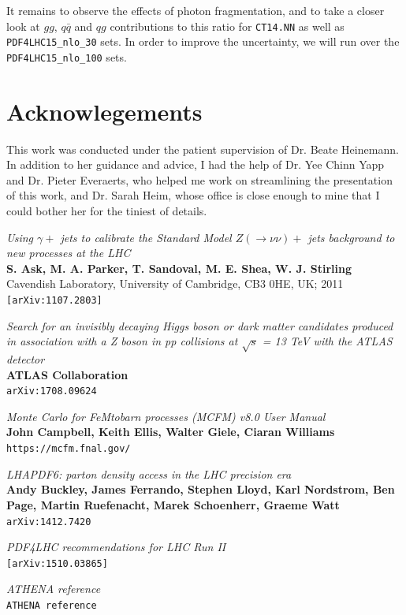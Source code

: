 \documentclass[11pt,a4paper,final]{report}
\begin{document}
It remains to observe the effects of photon fragmentation, and to take a closer look at $gg$, $q\bar{q}$ and $qg$ contributions to this ratio for \texttt{CT14.NN} as well as \texttt{PDF4LHC15\_nlo\_30} sets. In order to improve the uncertainty, we will run over the \texttt{PDF4LHC15\_nlo\_100} sets.

\section*{Acknowlegements}
This work was conducted under the patient supervision of Dr. Beate Heinemann. In addition to her guidance and advice, I had the help of Dr. Yee Chinn Yapp and Dr. Pieter Everaerts, who helped me work on streamlining the presentation of this work, and Dr. Sarah Heim, whose office is close enough to mine that I could bother her for the tiniest of details.

\begin{thebibliography}{9}
	\textit{Using $\gamma +$ jets to calibrate the Standard Model $Z(\rightarrow \nu\nu)+$ jets background to new processes at the LHC}\\
	\textbf{S. Ask, M. A. Parker, T. Sandoval, M. E. Shea, W. J. Stirling}\\
Cavendish Laboratory, University of Cambridge, CB3 0HE, UK; 2011\\
	\texttt{[arXiv:1107.2803]}
	
	\textit{Search for an invisibly decaying Higgs boson or dark matter candidates produced in association with a Z boson in pp collisions at $\sqrt{s}$ = 13 TeV with the ATLAS detector}\\
	\textbf{ATLAS Collaboration}\\
	\texttt{arXiv:1708.09624}

	\textit{Monte Carlo for FeMtobarn processes (MCFM) v8.0 User Manual}\\
	\textbf{John Campbell, Keith Ellis, Walter Giele, Ciaran Williams}\\
	\texttt{https://mcfm.fnal.gov/}
	
	\textit{LHAPDF6: parton density access in the LHC precision era}\\
	\textbf{Andy Buckley, James Ferrando, Stephen Lloyd, Karl Nordstrom, Ben Page, Martin Ruefenacht, Marek Schoenherr, Graeme Watt}\\
	\texttt{arXiv:1412.7420}
	
	\textit{PDF4LHC recommendations for LHC Run II}\\
	\texttt{[arXiv:1510.03865]}

	\textit{ATHENA reference}\\
	\texttt{ATHENA reference}
	\
\end{thebibliography}
\end{document}
